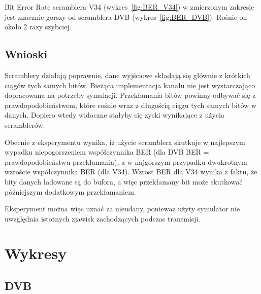 \documentclass[polish, 11pt]{article}
\begin{document}
        Bit Error Rate scramblera V34 (wykres~\ref{fig:BER_V34}) w zmierzonym zakresie jest znacznie gorszy od scramblera DVB (wykres~\ref{fig:BER_DVB}).
        Rośnie on około 2 razy szybciej.

    \subsection{Wnioski}
        Scramblery działają poprawnie, dane wyjściowe składają się głównie z krótkich ciągów tych samych bitów.
        Bieżąca implementacja kanału nie jest wystarczająco dopracowana na potrzeby symulacji.
        Przekłamania bitów powinny odbywać się z prawdopodobieństwem, które rośnie wraz z długością ciągu tych samych bitów w danych.
        Dopiero wtedy widoczne stałyby się zyski wynikające z użycia scramblerów.
        
        Obecnie z eksperymentu wynika, iż użycie scramblera skutkuje w najlepszym wypadku niepogorszeniem współczynnika BER (dla DVB BER = prawdopodobieństwu przekłamania),
        a w najgorszym przypadku dwukrotnym wzroście współczynnika BER (dla V34).
        Wzrost BER dla V34 wynika z faktu, że bity danych ładowane są do bufora, a więc przekłamany bit może skutkować późniejszym dodatkowym przekłamaniem.

        Eksperyment można więc uznać za nieudany, ponieważ użyty symulator nie uwzględnia istotnych zjawisk zachodzących podczas transmisji.

\newpage
\section{Wykresy}
    \subsection{DVB}
\end{document}
